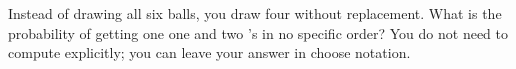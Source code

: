 \documentclass[12pt]{article}
\begin{document}
%
%

 Instead of drawing all six balls, you draw four without replacement. What is the probability of getting one  one  and two 's in no specific order? You do not need to compute explicitly; you can leave your answer in choose notation. 

\eenum

\pagebreak
\end{document}
